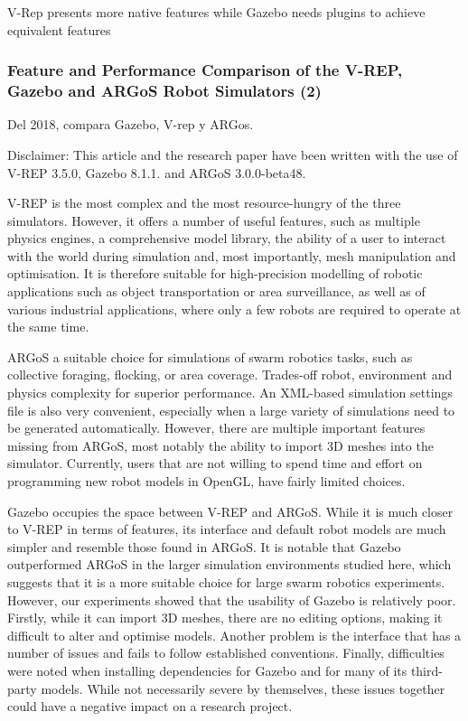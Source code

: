 V-Rep  presents  more  native  features  while  Gazebo needs plugins to achieve equivalent features

\subsubsection{Feature and Performance Comparison of the V-REP, Gazebo and ARGoS Robot Simulators (2)}
Del 2018, compara Gazebo, V-rep y ARGos.

Disclaimer: This article and the research paper have been written with the use of V-REP 3.5.0, Gazebo 8.1.1. and ARGoS 3.0.0-beta48.

V-REP is the most complex and the most resource-hungry of the three simulators. However, it offers a number of useful features, such as multiple physics engines, a comprehensive model library, the ability of a user to interact with the  world  during  simulation  and,  most  importantly,  mesh  manipulation  and optimisation. It is therefore suitable for high-precision modelling of robotic applications such as object transportation or area surveillance, as well as of various industrial applications, where only a few robots are required to operate at the same time. 

ARGoS a suitable choice for simulations of swarm robotics tasks, such as collective foraging, flocking, or area coverage. Trades-off robot, environment and physics complexity for superior performance. An XML-based simulation settings file is also very convenient, especially when a large variety of simulations need to be generated automatically. However, there are multiple important features missing from ARGoS, most notably the ability to import 3D meshes into the simulator. Currently, users that are not willing to spend time and effort on programming new robot models in OpenGL, have fairly limited choices.

Gazebo occupies the space between V-REP and ARGoS. While it is much closer to V-REP in terms of features, its interface and default robot models are much simpler and resemble those found in ARGoS. It is notable that Gazebo outperformed ARGoS in the larger simulation environments studied here, which suggests that it is a more suitable choice for large swarm robotics experiments. However, our experiments showed that the usability of Gazebo is relatively poor. Firstly, while it can import 3D meshes, there are no editing options, making it difficult to alter and optimise models. Another problem is the interface that has a number of issues and fails to follow established conventions. Finally, difficulties were noted when installing dependencies for Gazebo and for many of its third-party models. While not necessarily severe by themselves, these issues together could have a negative impact on a research project.


